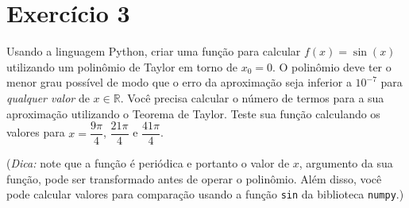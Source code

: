 \section{Exercício 3}


Usando a linguagem Python, criar uma função para calcular $f(x) = \sin(x)$ 
utilizando um polinômio de Taylor em torno de $x_0 = 0$. 
O polinômio deve ter o menor grau possível de modo que o erro da aproximação seja inferior 
a $10^{-7}$ para \textit{qualquer valor} de $x \in \mathbb{R}$. 
Você precisa calcular o número de termos para a sua aproximação utilizando o Teorema de Taylor. 
Teste sua função calculando os valores para $x = \dfrac{9\pi}{4}$, $\dfrac{21\pi}{4}$ e $\dfrac{41\pi}{4}$.\linebreak

\vspace{0.1em}

(\textit{Dica:} note que a função é periódica e portanto o valor de $x$, argumento da sua função, pode ser transformado antes de operar o polinômio. Além disso, você pode calcular valores para comparação usando a função \texttt{sin} da biblioteca \texttt{numpy}.)



